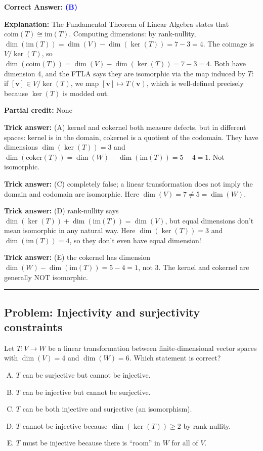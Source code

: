 \documentclass[12pt]{amsart}
\newcommand{\divider}{
  \vspace{-1em}
  \noindent
  \raisebox{-0.15ex}{\textbullet}%
  \hspace{0.5em}%
  \rule[0.5ex]{0.95\textwidth}{1.0pt}%
  \hspace{0.5em}%
  \raisebox{-0.15ex}{\textbullet}%
  \vspace{0em}
}
\begin{document}
\textbf{Correct Answer:} \textcolor{blue}{\textbf{(B)}}

\textbf{Explanation:} The Fundamental Theorem of Linear Algebra states that $\text{coim}(T) \cong \text{im}(T)$. Computing dimensions: by rank-nullity, $\dim(\text{im}(T)) = \dim(V) - \dim(\ker(T)) = 7 - 3 = 4$. The coimage is $V/\ker(T)$, so $\dim(\text{coim}(T)) = \dim(V) - \dim(\ker(T)) = 7 - 3 = 4$. Both have dimension 4, and the FTLA says they are isomorphic via the map induced by $T$: if $[\mathbf{v}] \in V/\ker(T)$, we map $[\mathbf{v}] \mapsto T(\mathbf{v})$, which is well-defined precisely because $\ker(T)$ is modded out.

\textbf{Partial credit:} None

\textbf{Trick answer:} (A) kernel and cokernel both measure defects, but in different spaces: kernel is in the domain, cokernel is a quotient of the codomain. They have dimensions $\dim(\ker(T)) = 3$ and $\dim(\text{coker}(T)) = \dim(W) - \dim(\text{im}(T)) = 5 - 4 = 1$. Not isomorphic.

\textbf{Trick answer:} (C) completely false; a linear transformation does not imply the domain and codomain are isomorphic. Here $\dim(V) = 7 \neq 5 = \dim(W)$.

\textbf{Trick answer:} (D) rank-nullity says $\dim(\ker(T)) + \dim(\text{im}(T)) = \dim(V)$, but equal dimensions don't mean isomorphic in any natural way. Here $\dim(\ker(T)) = 3$ and $\dim(\text{im}(T)) = 4$, so they don't even have equal dimension!

\textbf{Trick answer:} (E) the cokernel has dimension $\dim(W) - \dim(\text{im}(T)) = 5 - 4 = 1$, not 3. The kernel and cokernel are generally NOT isomorphic.

\divider

\subsection*{Problem: Injectivity and surjectivity constraints}

Let $T: V \to W$ be a linear transformation between finite-dimensional vector spaces with $\dim(V) = 4$ and $\dim(W) = 6$. Which statement is correct?

\begin{enumerate}[(A)]
\item $T$ can be surjective but cannot be injective.
\item $T$ can be injective but cannot be surjective.
\item $T$ can be both injective and surjective (an isomorphism).
\item $T$ cannot be injective because $\dim(\ker(T)) \geq 2$ by rank-nullity.
\item $T$ must be injective because there is ``room'' in $W$ for all of $V$.
\end{enumerate}
\end{document}
